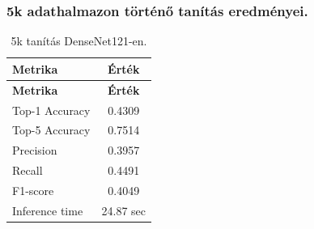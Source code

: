 \subsubsection{5k adathalmazon történő tanítás eredményei.}
\begin{center}
  \begin{longtable}{l c}
  \caption{5k tanítás DenseNet121-en.} \label{tab:phase03_DenseNet121_5k} \\
  \toprule
  \textbf{Metrika} & \textbf{Érték} \\
  \midrule
  \endfirsthead
  \toprule
  \textbf{Metrika} & \textbf{Érték} \\
  \midrule
  \endhead
  Top-1 Accuracy & 0.4309 \\
  Top-5 Accuracy & 0.7514 \\
  Precision      & 0.3957 \\
  Recall         & 0.4491 \\
  F1-score       & 0.4049 \\
  Inference time & 24.87 sec \\
  \bottomrule
  \end{longtable}
\end{center}

